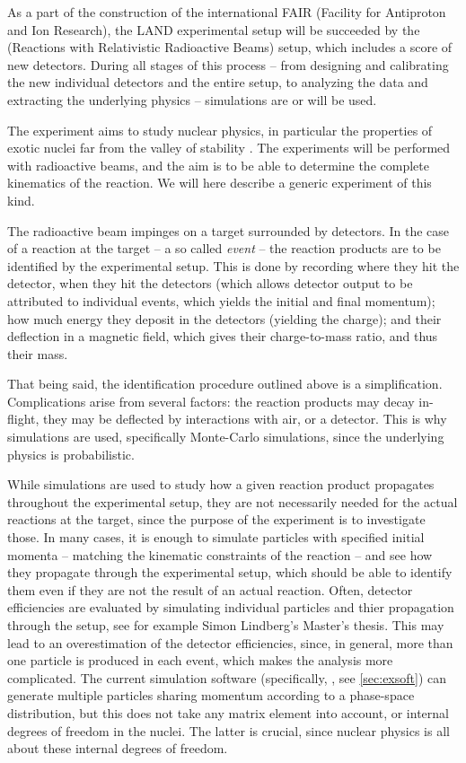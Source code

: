 As a part of the construction of the international FAIR (Facility for Antiproton and Ion Research), the LAND experimental setup will be succeeded by the \rtb{} (Reactions with Relativistic Radioactive Beams) setup, which includes a score of new detectors. During all stages of this process -- from designing and calibrating the new individual detectors and the entire setup, to analyzing the data and extracting the underlying physics -- simulations are or will be used. 

The \rtb{} experiment aims to study nuclear physics, in particular the properties of exotic nuclei far from the valley of stability \cite{r3b:online}. The experiments will be performed with radioactive beams, and the aim is to be able to determine the complete kinematics of the reaction. We will here describe a generic experiment of this kind.

The radioactive beam impinges on a target surrounded by detectors. In the case of a reaction at the target -- a so called \emph{event} -- the reaction products are to be identified by the experimental setup. 
This is done by recording where they hit the detector, when they hit the detectors (which allows detector output to be attributed to individual events, which yields the initial and final momentum); how much energy they deposit in the detectors (yielding the charge); and their deflection in a magnetic field, which gives their charge-to-mass ratio, and thus their mass. 

That being said, the identification procedure outlined above is a simplification. Complications arise from several factors: the reaction products may decay in-flight, they may be deflected by interactions with air, or a detector. This is why simulations are used, specifically Monte-Carlo simulations, since the underlying physics is probabilistic. 

While simulations are used to study how a given reaction product propagates throughout the experimental setup, they are not necessarily needed for the actual reactions at the target, since the purpose of the experiment is to investigate those. 
In many cases, it is enough to simulate particles with specified initial momenta -- matching the kinematic constraints of the reaction -- and see how they propagate through the experimental setup, which should be able to identify them even if they are not the result of an actual reaction.
Often, detector efficiencies are evaluated by simulating individual particles and thier propagation through the setup, see for example Simon Lindberg's Master's thesis\cite{simon:2013:thesis}. This may lead to an overestimation of the detector efficiencies, since, in general, more than one particle is produced in each event, which makes the analysis more complicated. The current simulation software (specifically, \cite{johansson:2013:online}, see \autoref{sec:exsoft}) can generate multiple particles sharing momentum according to a phase-space distribution, but this does not take any matrix element into account, or internal degrees of freedom in the nuclei. The latter is crucial, since nuclear physics is all about these internal degrees of freedom. 

